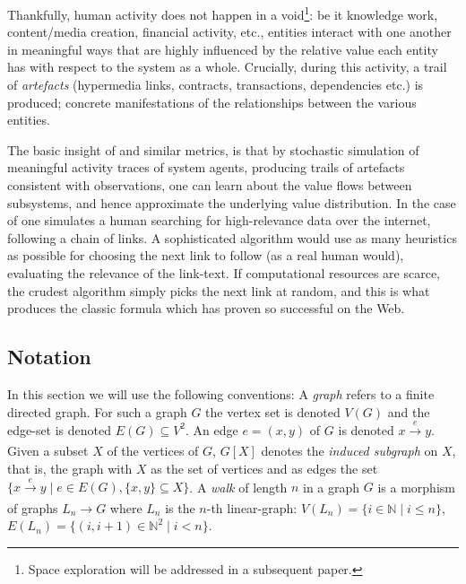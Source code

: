 Thankfully, human activity does not happen in a void\footnote{Space
  exploration will be addressed in a subsequent paper.}: be it
knowledge work, content/media creation, financial activity, etc.,
entities interact with one another in meaningful ways that are highly
influenced by the relative value each entity has with respect to the
system as a whole. Crucially, during this activity, a trail of
\emph{artefacts} (hypermedia links, contracts, transactions,
dependencies etc.) is produced; concrete manifestations
of the relationships between the various entities.



The basic insight of \pagerank{} and similar metrics, is that by
stochastic simulation of meaningful activity traces of system agents,
producing trails of artefacts consistent with observations, one can
learn about the value flows between subsystems, and hence approximate
the underlying value distribution. In the case of \pagerank{} one
simulates a human searching for high-relevance data over the internet,
following a chain of links. A sophisticated algorithm would use as
many heuristics as possible for choosing the next link to follow (as a
real human would), \eg{} evaluating the relevance of the link-text. If
computational resources are scarce, the crudest algorithm simply picks
the next link at random, and this is what produces the classic
\pagerank{} formula which has proven so successful on the Web.

\subsection{Notation}

In this section we will use the following conventions: A \emph{graph} refers to
a finite directed graph. For such a graph $G$ the vertex set is denoted $V(G)$
and the edge-set is denoted $E(G) \subseteq V^2$. An edge $e = (x,y)$ of $G$ is
denoted $x \xrightarrow[]{e} y$. Given a subset $X$ of the vertices of $G$,
$G[X]$ denotes the \emph{induced subgraph} on $X$, that is, the graph with $X$
as the set of vertices and as edges the set
$\{ x \xrightarrow[]{e} y \mid e \in E(G), \{x,y\} \subseteq X\}$. A \emph{walk}
of length $n$ in a graph $G$ is a morphism of graphs $L_n \to G$ where $L_n$ is
the $n$-th linear-graph: $V(L_n) = \{i \in \mathbb{N} \mid i \leq n \}$,
$E(L_n) = \{ (i,i+1) \in \mathbb{N}^2 \mid i < n \}$.

